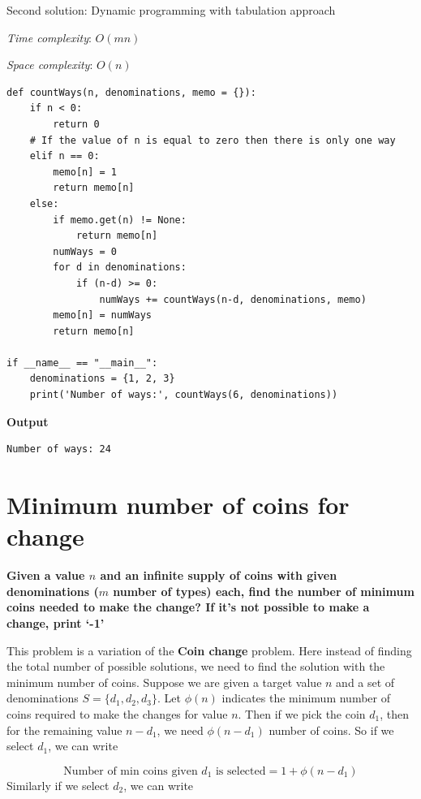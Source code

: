 \documentclass[a4paper,11pt]{book}
\begin{document}
\noindent Second solution: Dynamic programming with tabulation approach
\vspace{5mm}

\noindent \textit{Time complexity}: $O(mn)$

\noindent \textit{Space complexity}: $O(n)$

\begin{lstlisting}
def countWays(n, denominations, memo = {}):
    if n < 0:
        return 0
    # If the value of n is equal to zero then there is only one way
    elif n == 0:
        memo[n] = 1
        return memo[n]
    else:
        if memo.get(n) != None:
            return memo[n]
        numWays = 0
        for d in denominations:
            if (n-d) >= 0:
                numWays += countWays(n-d, denominations, memo)
        memo[n] = numWays
        return memo[n]

if __name__ == "__main__":
    denominations = {1, 2, 3}
    print('Number of ways:', countWays(6, denominations))
\end{lstlisting}
\textbf{Output}
\begin{lstlisting}
Number of ways: 24
\end{lstlisting}

\newpage
\section{Minimum number of coins for change}

\noindent \textbf{Given a value $n$ and an infinite supply of coins with given denominations ($m$ number of types) each, find the number of minimum coins needed to make the change?  If it's not possible to make a change, print `-1'}

\vspace{5mm}

\noindent This problem is a variation of the \textbf{Coin change} problem. Here instead of finding the total number of possible solutions, we need to find the solution with the minimum number of coins. Suppose we are given a target value $n$ and a set of denominations $S = \{d_1, d_2, d_3\}$. Let $\phi(n)$ indicates the minimum number of coins required to make the changes for value $n$. Then if we pick the coin $d_1$, then for the remaining value $n-d_1$, we need $\phi(n-d_1)$ number of coins. So if we select $d_1$, we can write

$$\text{Number of min coins given $d_1$ is selected} = 1 + \phi(n-d_1)$$
\noindent Similarly if we select $d_2$, we can write
\end{document}
